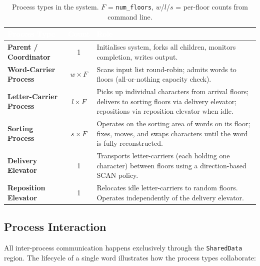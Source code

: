 \documentclass[12pt,a4paper]{article}
\newcommand{\code}[1]{\texttt{\small #1}}
\begin{document}
\begin{table}[h!]
\centering
\caption{Process types in the system. $F$ = \texttt{num\_floors},
         $w$/$l$/$s$ = per-floor counts from command line.}
\begin{tabularx}{\textwidth}{>{\bfseries}l c X}
\toprule
\rowcolor{darkblue}
\textcolor{white}{Process Type} &
\textcolor{white}{Count} &
\textcolor{white}{Role} \\
\midrule
Parent / Coordinator & 1 &
  Initialises system, forks all children, monitors completion, writes output. \\
\rowcolor{rowgray}
Word-Carrier Process & $w \times F$ &
  Scans input list round-robin; admits words to floors (all-or-nothing
  capacity check). \\
Letter-Carrier Process & $l \times F$ &
  Picks up individual characters from arrival floors; delivers to sorting
  floors via delivery elevator; repositions via reposition elevator when idle. \\
\rowcolor{rowgray}
Sorting Process & $s \times F$ &
  Operates on the sorting area of words on its floor; fixes, moves, and
  swaps characters until the word is fully reconstructed. \\
Delivery Elevator & 1 &
  Transports letter-carriers (each holding one character) between floors
  using a direction-based SCAN policy. \\
\rowcolor{rowgray}
Reposition Elevator & 1 &
  Relocates idle letter-carriers to random floors. Operates independently
  of the delivery elevator. \\
\bottomrule
\end{tabularx}
\end{table}

\subsection{Process Interaction}

All inter-process communication happens exclusively through the \code{SharedData}
region. The lifecycle of a single word illustrates how the process types
collaborate:
\end{document}
